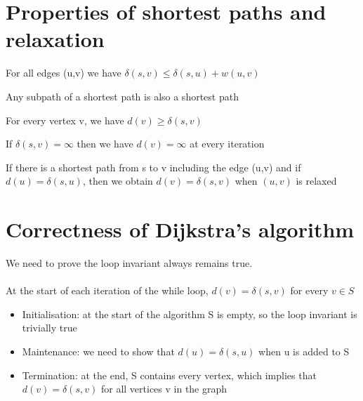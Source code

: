\documentclass{article}[18pt]
\begin{document}
\section{Properties of shortest paths and relaxation}
\begin{definition}
For all edges (u,v) we have $\delta(s,v)\leqslant \delta(s,u)+w(u,v)$
\end{definition}
\newpage
\begin{definition}
Any subpath of a shortest path is also a shortest path
\end{definition}
\begin{definition}
For every vertex v, we have $d(v)\geqslant \delta(s,v)$
\end{definition}
\begin{definition}
If $\delta(s,v)=\infty$ then we have $d(v)=\infty$ at every iteration
\end{definition}
\begin{definition}
If there is a shortest path from s to v including the edge (u,v) and if $d(u)=\delta(s,u)$, then we obtain $d(v)=\delta(s,v)$ when $(u,v)$ is relaxed
\end{definition}
\section{Correctness of Dijkstra's algorithm}
We need to prove the loop invariant always remains true.\\
\\
At the start of each iteration of the while loop, $d(v)=\delta(s,v)$ for every $v\in S$
\begin{itemize}
	\item Initialisation: at the start of the algorithm S is empty, so the loop invariant is trivially true
	\item Maintenance: we need to show that $d(u)=\delta(s,u)$ when u is added to S
	\item Termination: at the end, S contains every vertex, which implies that $d(v)=\delta(s,v)$ for all vertices v in the graph
\end{itemize}
\end{document}
